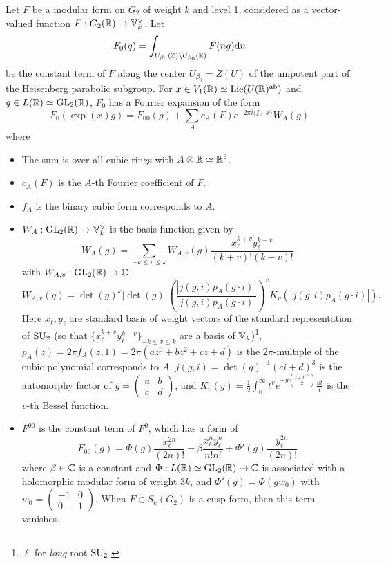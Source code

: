\begin{theorem}
\label{thm:g2modfourierexp}
Let $F$ be a modular form on $G_2$ of weight $k$ and level 1, considered as a vector-valued function $F: G_2(\mathbb{R}) \to \mathbb{V}_k^\vee$.
Let
$$
F_0(g) = \int_{U_{\beta_0}(\mathbb{Z}) \backslash U_{\beta_0}(\mathbb{R})} F(ng) \mathrm{d} n
$$
be the constant term of $F$ along the center $U_{\beta_0} = Z(U)$ of the unipotent part of the Heisenberg parabolic subgroup.
For $x \in V_1(\mathbb{R}) \simeq \mathrm{Lie}(U(\mathbb{R})^{\mathrm{ab}})$ and $g \in L(\mathbb{R}) \simeq \mathrm{GL}_2(\mathbb{R})$, $F_0$ has a Fourier expansion of the form
$$
F_0(\exp(x)g) = F_{00}(g) + \sum_{A} c_A(F) e^{-2 \pi i \langle f_A, x \rangle} W_{A}(g)
$$
where
\begin{itemize}
    \item The sum is over all cubic rings with $A \otimes \mathbb{R} \simeq \mathbb{R}^3$.
    \item $c_A(F)$ is the $A$-th Fourier coefficient of $F$.
    \item $f_A$ is the binary cubic form corresponds to $A$.
    \item $W_A : \mathrm{GL}_2(\mathbb{R}) \to \mathbb{V}_k^\vee$ is the basis function given by
    $$
        W_A(g) = \sum_{-k \le v \le k} W_{A, v}(g) \frac{x_\ell^{k + v}y_\ell^{k - v}}{(k+v)!(k-v)!}
    $$
    with $W_{A, v}: \mathrm{GL}_2(\mathbb{R}) \to \mathbb{C}$,
    $$
        W_{A, v}(g) = \det(g)^k |\det(g)| \left(\frac{|j(g, i) p_A(g \cdot i)|}{j(g, i) p_A(g \cdot i)}\right)^{v} K_v(|j(g, i)p_A(g \cdot i)|).
    $$
    Here $x_\ell, y_\ell$ are standard basis of weight vectors of the standard representation of $\mathrm{SU}_2$ (so that $\{x_\ell^{k + v} y_\ell^{k - v}\}_{-k \le v \le k}$ are a basis of $\mathbb{V}_k$)\footnote{$\ell$ for \emph{long} root $\mathrm{SU}_2$.}, $p_A(z) = 2 \pi f_A(z, 1) =  2\pi(az^3 + bz^2 + cz + d)$ is the $2\pi$-multiple of the cubic polynomial corresponds to $A$, $j(g, i) = \det(g)^{-1}(ci + d)^3$ is the automorphy factor of $g = \left(\begin{smallmatrix}
        a & b \\ c & d
    \end{smallmatrix}\right)$, and $K_v(y) = \frac{1}{2}\int_0^\infty t^v e^{-y(\frac{t + t^{-1}}{2})} \frac{\dd t}{t}$ is the $v$-th Bessel function.
    \item $F^{00}$ is the constant term of $F^0$, which has a form of
    $$
        F_{00}(g) = \Phi(g) \frac{x_\ell^{2n}}{(2n)!} + \beta \frac{x_\ell^n y_\ell^n}{n! n!} + \Phi'(g) \frac{y_\ell^{2n}}{(2n)!}
    $$
    where $\beta \in \mathbb{C}$ is a constant and $\Phi: L(\mathbb{R}) \simeq \mathrm{GL}_2(\mathbb{R})\to \mathbb{C}$ is associated with a holomorphic modular form of weight $3k$, and $\Phi'(g) = \Phi(g w_0)$ with $w_0 = \left(\begin{smallmatrix}
        -1 & 0 \\ 0 & 1
    \end{smallmatrix}\right)$.
    When $F \in S_k(G_2)$ is a cusp form, then this term vanishes.
\end{itemize}
\end{theorem}


